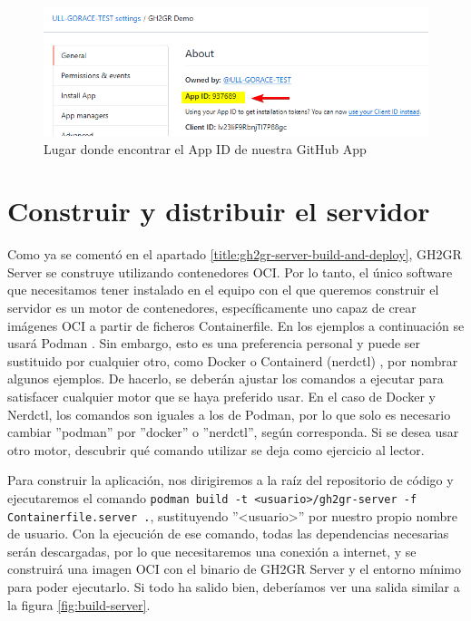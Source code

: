 \begin{figure}
    \centering
    \includegraphics[width=0.75\linewidth]{images/gh-app-id.png}
    \caption{Lugar donde encontrar el App ID de nuestra GitHub App}
    \label{fig:gh-app-id}
\end{figure}

\section{Construir y distribuir el servidor}
Como ya se comentó en el apartado \ref{title:gh2gr-server-build-and-deploy}, GH2GR Server se construye utilizando contenedores OCI. Por lo tanto, el único software que necesitamos tener instalado en el equipo con el que queremos construir el servidor es un motor de contenedores, específicamente uno capaz de crear imágenes OCI a partir de ficheros Containerfile. En los ejemplos a continuación se usará Podman \cite{podmanWhatPodman}. Sin embargo, esto es una preferencia personal y puede ser sustituido por cualquier otro, como Docker \cite{dockerDockerEngine} o Containerd (nerdctl) \cite{githubGitHubContainerdnerdctl}, por nombrar algunos ejemplos. De hacerlo, se deberán ajustar los comandos a ejecutar para satisfacer cualquier motor que se haya preferido usar. En el caso de Docker y Nerdctl, los comandos son iguales a los de Podman, por lo que solo es necesario cambiar ''podman'' por ''docker'' o ''nerdctl'', según corresponda. Si se desea usar otro motor, descubrir qué comando utilizar se deja como ejercicio al lector.

\begin{sloppypar}
Para construir la aplicación, nos dirigiremos a la raíz del repositorio de código y ejecutaremos el comando \texttt{podman build -t <usuario>/gh2gr-server -f Containerfile.server .}, sustituyendo ''<usuario>'' por nuestro propio nombre de usuario. Con la ejecución de ese comando, todas las dependencias necesarias serán descargadas, por lo que necesitaremos una conexión a internet, y se construirá una imagen OCI con el binario de GH2GR Server y el entorno mínimo para poder ejecutarlo. Si todo ha salido bien, deberíamos ver una salida similar a la figura \ref{fig:build-server}.
\end{sloppypar}

